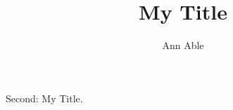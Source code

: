 \documentclass{revtex4-2}
\makeatletter
\let\orig@title\title
\renewcommand{\title}[1]{\gdef\firstdef{#1}\orig@title{#1}}
\let\title\orig@title
\renewcommand{\title}[1]{\gdef\seconddef{#1}\orig@title{#1}}
\makeatother
\begin{document}
\title{My Title}
\author{Ann Able}
\maketitle
Second: \seconddef.
\end{document}
